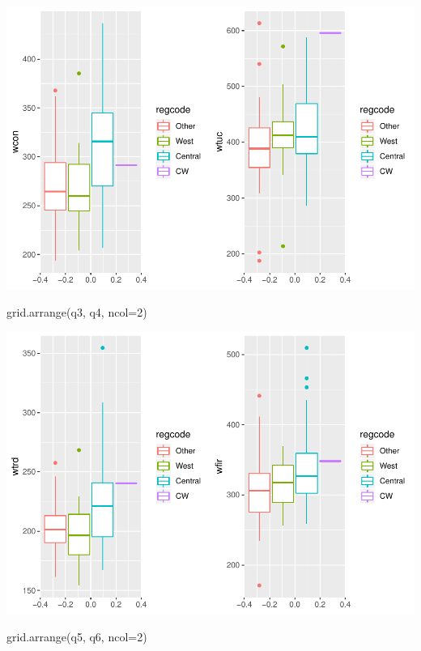 \documentclass[]{article}
\newenvironment{Shaded}{}{}
\newcommand{\DataTypeTok}[1]{#1}
\newcommand{\DecValTok}[1]{#1}
\newcommand{\KeywordTok}[1]{\textcolor[rgb]{0.00,0.00,1.00}{#1}}
\newcommand{\NormalTok}[1]{#1}
\begin{document}
\includegraphics{Bagnard_Gaustad_Hartman_Leung_Lab_3_files/figure-latex/unnamed-chunk-15-1.pdf}

\begin{Shaded}
\begin{Highlighting}[]
\KeywordTok{grid.arrange}\NormalTok{(q3, q4, }\DataTypeTok{ncol=}\DecValTok{2}\NormalTok{)}
\end{Highlighting}
\end{Shaded}

\includegraphics{Bagnard_Gaustad_Hartman_Leung_Lab_3_files/figure-latex/unnamed-chunk-15-2.pdf}

\begin{Shaded}
\begin{Highlighting}[]
\KeywordTok{grid.arrange}\NormalTok{(q5, q6, }\DataTypeTok{ncol=}\DecValTok{2}\NormalTok{)}
\end{Highlighting}
\end{Shaded}
\end{document}
